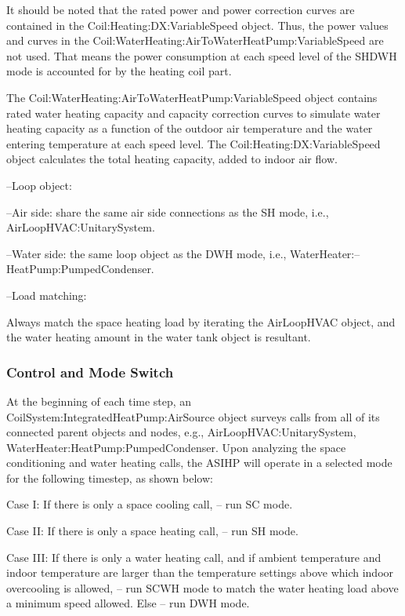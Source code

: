 It should be noted that the rated power and power correction curves are contained in the Coil:Heating:DX:VariableSpeed object. Thus, the power values and curves in the Coil:WaterHeating:AirToWaterHeatPump:VariableSpeed are not used. That means the power consumption at each speed level of the SHDWH mode is accounted for by the heating coil part. 

The Coil:WaterHeating:AirToWaterHeatPump:VariableSpeed object contains rated water heating capacity and capacity correction curves to simulate water heating capacity as a function of the outdoor air temperature and the water entering temperature at each speed level. The Coil:Heating:DX:VariableSpeed object calculates the total heating capacity, added to indoor air flow. 

--Loop object: 

--Air side: share the same air side connections as the SH mode, i.e., AirLoopHVAC:UnitarySystem.

--Water side: the same loop object as the DWH mode, i.e., WaterHeater:--HeatPump:PumpedCondenser.

--Load matching: 

Always match the space heating load by iterating the AirLoopHVAC object, and the water heating amount in the water tank object is resultant.

\subsubsection{Control and Mode Switch}\label{Control-and-Mode-Switch-ASIHP}

At the beginning of each time step, an CoilSystem:IntegratedHeatPump:AirSource object surveys calls from all of its connected parent objects and nodes, e.g.,  AirLoopHVAC:UnitarySystem, WaterHeater:HeatPump:PumpedCondenser. Upon analyzing the space conditioning and water heating calls, the ASIHP will operate in a selected mode for the following timestep, as shown below:

Case I: 
If there is only a space cooling call, – run SC mode.
 
Case II: 
If there is only a space heating call, – run SH mode.

Case III: 
If there is only a water heating call, and if ambient temperature and indoor temperature are larger than the temperature settings above which indoor overcooling is allowed, – run SCWH mode to match the water heating load above a minimum speed allowed.
Else – run DWH mode.

